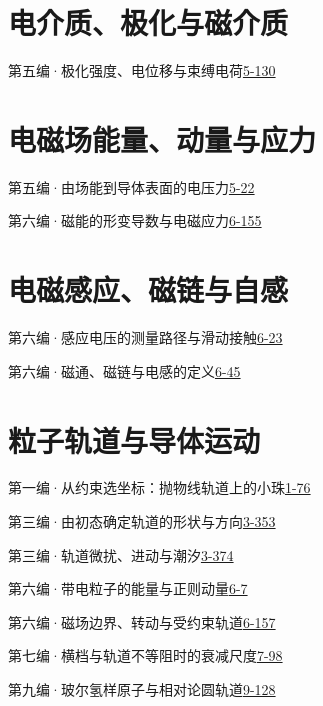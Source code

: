 \section*{电介质、极化与磁介质}
\noindent 第五编·极化强度、电位移与束缚电荷\quad\href{course-page:5:132}{5-130}\par
\section*{电磁场能量、动量与应力}
\noindent 第五编·由场能到导体表面的电压力\quad\href{course-page:5:24}{5-22}\par
\noindent 第六编·磁能的形变导数与电磁应力\quad\href{course-page:6:158}{6-155}\par
\section*{电磁感应、磁链与自感}
\noindent 第六编·感应电压的测量路径与滑动接触\quad\href{course-page:6:26}{6-23}\par
\noindent 第六编·磁通、磁链与电感的定义\quad\href{course-page:6:48}{6-45}\par
\section*{粒子轨道与导体运动}
\noindent 第一编·从约束选坐标：抛物线轨道上的小珠\quad\href{course-page:1:81}{1-76}\par
\noindent 第三编·由初态确定轨道的形状与方向\quad\href{course-page:3:356}{3-353}\par
\noindent 第三编·轨道微扰、进动与潮汐\quad\href{course-page:3:377}{3-374}\par
\noindent 第六编·带电粒子的能量与正则动量\quad\href{course-page:6:10}{6-7}\par
\noindent 第六编·磁场边界、转动与受约束轨道\quad\href{course-page:6:160}{6-157}\par
\noindent 第七编·横档与轨道不等阻时的衰减尺度\quad\href{course-page:7:101}{7-98}\par
\noindent 第九编·玻尔氢样原子与相对论圆轨道\quad\href{course-page:9:132}{9-128}\par
